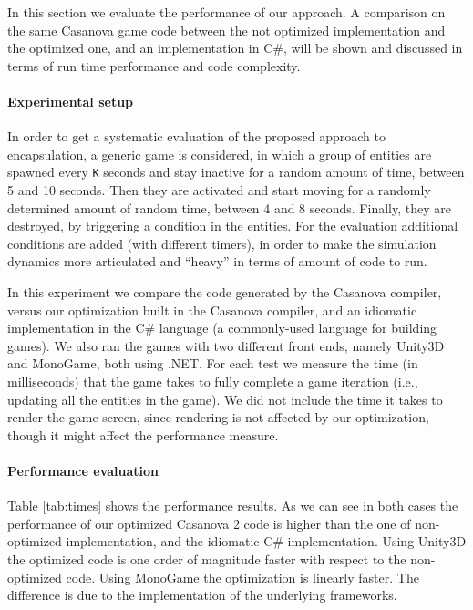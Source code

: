 In this section we evaluate the performance of our approach. A comparison on the same Casanova game code between the not optimized implementation and the optimized one, and an implementation in C\#, will be shown and discussed in terms of run time performance and code complexity.
\paragraph*{Experimental setup} In order to get a systematic evaluation of the proposed approach to encapsulation, a generic game is considered, in which a group of entities are spawned every \texttt{K} seconds and stay inactive for a random amount of time, between 5 and 10 seconds. Then they are activated and start moving for a randomly determined amount of random time, between 4 and 8 seconds. Finally, they are destroyed, by triggering a condition in the entities. For the evaluation additional conditions are added (with different timers), in order to make the simulation dynamics more articulated and ``heavy'' in terms of amount of code to run.


In this experiment we compare the code generated by the Casanova compiler, versus our optimization built in the Casanova compiler, and an idiomatic implementation in the C\# language (a commonly-used language for building games). We also ran the games with two different front ends, namely Unity3D and MonoGame, both using .NET.
For each test we measure the time (in milliseconds) that the game takes to fully complete a game iteration (i.e., updating all the entities in the game). We did not include the time it takes to render the game screen, since rendering is not affected by our optimization, though it might affect the performance measure.
\paragraph*{Performance evaluation} Table \ref{tab:times} shows the performance results. As we can see in both cases the performance of our optimized Casanova 2 code is higher than the one of non-optimized implementation, and the idiomatic C\# implementation. Using Unity3D the optimized code is one order of magnitude faster with respect to the non-optimized code. Using MonoGame the optimization is linearly faster. The difference is due to the implementation of the underlying frameworks.


